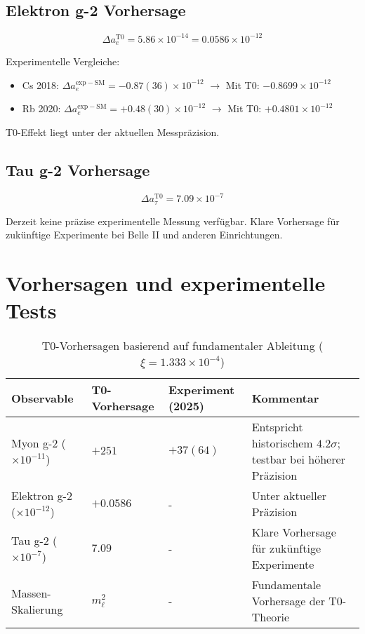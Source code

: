 \documentclass[12pt,a4paper]{article}
\begin{document}
	\subsection{Elektron g-2 Vorhersage}
	
	\begin{equation}
		\Delta a_e^{\mathrm{T0}} = 5.86 \times 10^{-14} = 0.0586 \times 10^{-12}
	\end{equation}
	
	\begin{verification}
		Experimentelle Vergleiche:
		\begin{itemize}
			\item Cs 2018: $\Delta a_e^{\mathrm{exp-SM}} = -0.87(36) \times 10^{-12}$ $\rightarrow$ Mit T0: $-0.8699 \times 10^{-12}$
			\item Rb 2020: $\Delta a_e^{\mathrm{exp-SM}} = +0.48(30) \times 10^{-12}$ $\rightarrow$ Mit T0: $+0.4801 \times 10^{-12}$
		\end{itemize}
		T0-Effekt liegt unter der aktuellen Messpräzision.
	\end{verification}
	
	\subsection{Tau g-2 Vorhersage}
	
	\begin{equation}
		\Delta a_\tau^{\mathrm{T0}} = 7.09 \times 10^{-7}
	\end{equation}
	
	\begin{verification}
		Derzeit keine präzise experimentelle Messung verfügbar. Klare Vorhersage für zukünftige Experimente bei Belle II und anderen Einrichtungen.
	\end{verification}
	
	\section{Vorhersagen und experimentelle Tests}
	
	\begin{table}[htbp]
		\centering
		\footnotesize
		\begin{tabular}{L{2.5cm}C{2cm}C{2cm}L{3.5cm}}
			\toprule
			Observable & T0-Vorhersage & Experiment (2025) & Kommentar \\
			\midrule
			Myon g-2 ($\times 10^{-11}$) & $+251$ & $+37(64)$ & Entspricht historischem $4.2\sigma$; testbar bei höherer Präzision \\
			Elektron g-2 ($\times 10^{-12}$) & $+0.0586$ & - & Unter aktueller Präzision \\
			Tau g-2 ($\times 10^{-7}$) & $7.09$ & - & Klare Vorhersage für zukünftige Experimente \\
			Massen-Skalierung & $m_\ell^2$ & - & Fundamentale Vorhersage der T0-Theorie \\
			\bottomrule
		\end{tabular}
		\caption{T0-Vorhersagen basierend auf fundamentaler Ableitung ($\xi = 1.333 \times 10^{-4}$)}
		\label{tab:vorhersagen}
	\end{table}
	
\end{document}
